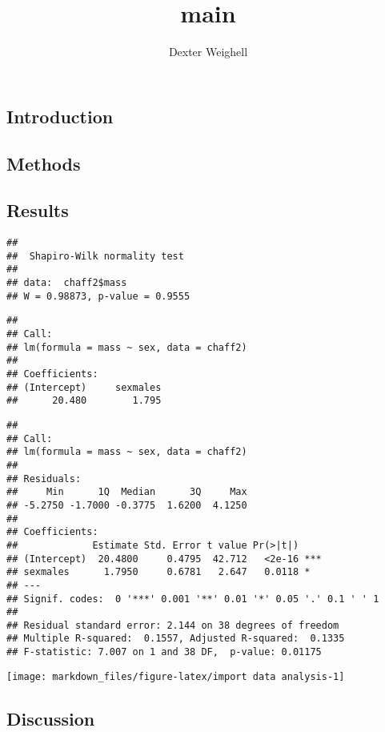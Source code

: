 \documentclass[
]{article}
\title{main}
\author{Dexter Weighell}
\date{}
\begin{document}
\maketitle

{
\setcounter{tocdepth}{2}
\tableofcontents
}
\hypertarget{introduction}{%
\subsection{\texorpdfstring{\textbf{Introduction}}{Introduction}}\label{introduction}}

\hypertarget{methods}{%
\subsection{\texorpdfstring{\textbf{Methods}}{Methods}}\label{methods}}

\hypertarget{results}{%
\subsection{\texorpdfstring{\textbf{Results}}{Results}}\label{results}}

\begin{verbatim}
## 
##  Shapiro-Wilk normality test
## 
## data:  chaff2$mass
## W = 0.98873, p-value = 0.9555
\end{verbatim}

\begin{verbatim}
## 
## Call:
## lm(formula = mass ~ sex, data = chaff2)
## 
## Coefficients:
## (Intercept)     sexmales  
##      20.480        1.795
\end{verbatim}

\begin{verbatim}
## 
## Call:
## lm(formula = mass ~ sex, data = chaff2)
## 
## Residuals:
##     Min      1Q  Median      3Q     Max 
## -5.2750 -1.7000 -0.3775  1.6200  4.1250 
## 
## Coefficients:
##             Estimate Std. Error t value Pr(>|t|)    
## (Intercept)  20.4800     0.4795  42.712   <2e-16 ***
## sexmales      1.7950     0.6781   2.647   0.0118 *  
## ---
## Signif. codes:  0 '***' 0.001 '**' 0.01 '*' 0.05 '.' 0.1 ' ' 1
## 
## Residual standard error: 2.144 on 38 degrees of freedom
## Multiple R-squared:  0.1557, Adjusted R-squared:  0.1335 
## F-statistic: 7.007 on 1 and 38 DF,  p-value: 0.01175
\end{verbatim}

\texttt{[image: markdown\_files/figure-latex/import data analysis-1]}

\hypertarget{discussion}{%
\subsection{\texorpdfstring{\textbf{Discussion}}{Discussion}}\label{discussion}}
\end{document}
